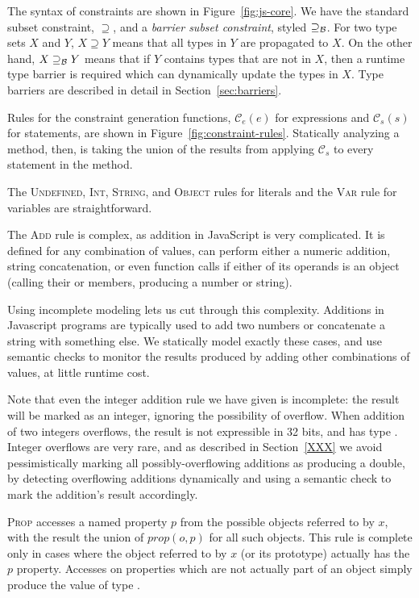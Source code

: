 The syntax of constraints are shown in Figure~\ref{fig:js-core}. We have the
standard subset constraint, $\supseteq$, and a \emph{barrier subset
  constraint}, styled $\supseteq_\mathcal{B}$. For two type sets $X$ and $Y$, $X \supseteq
Y$ means that all types in $Y$ are propagated to $X$. On the other hand, $X
\supseteq_\mathcal{B} Y$ means that if $Y$ contains types that are not in $X$, then a
runtime type barrier is required which can dynamically update the types in $X$.
Type barriers are described in detail in Section~\ref{sec:barriers}.

Rules for the constraint generation functions, $\mathcal{C}_e(e)$ for
expressions and $\mathcal{C}_s(s)$ for statements, are shown in
Figure~\ref{fig:constraint-rules}. Statically analyzing a method, then, is
taking the union of the results from applying $\mathcal{C}_s$ to every
statement in the method.

The \textsc{Undefined}, \textsc{Int}, \textsc{String}, and \textsc{Object}
rules for literals and the \textsc{Var} rule for variables are
straightforward.

The \textsc{Add} rule is complex, as addition in JavaScript is very complicated. It is
defined for any combination of values, can perform either a numeric addition,
string concatenation, or even function calls if either of its operands is an
object (calling their  or  members, producing a
number or string).

Using incomplete modeling lets us cut through this complexity.
Additions in Javascript programs are typically used to add two numbers
or concatenate a string with something else.
We statically model exactly these cases,
and use semantic checks to monitor the results produced by adding other
combinations of values, at little runtime cost.

Note that even the integer addition rule we have given is incomplete: the
result will be marked as an integer, ignoring the possibility of
overflow. When addition of two integers overflows, the result is not
expressible in 32 bits, and has type .
Integer overflows are very rare, and as described in Section~\ref{XXX}
we avoid pessimistically marking all possibly-overflowing additions as producing
a double, by detecting overflowing additions dynamically
and using a semantic check to mark the addition's result accordingly.

\textsc{Prop} accesses a named property $p$ from the possible objects referred
to by $x$, with the result the union of $\mathit{prop}(o,p)$ for all such
objects.  This rule is complete only in cases where the object referred to by
$x$ (or its prototype) actually has the $p$ property.  Accesses on properties
which are not actually part of an object simply produce the 
value of type .

